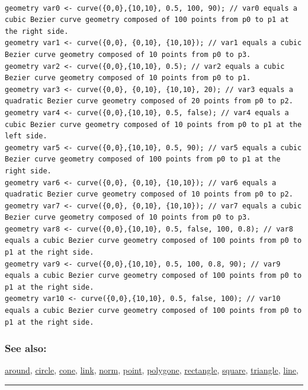 \documentclass[]{book}
\theoremstyle{definition}
\theoremstyle{definition}
\theoremstyle{definition}
\theoremstyle{remark}
\begin{document}
\begin{verbatim}
 
geometry var0 <- curve({0,0},{10,10}, 0.5, 100, 90); // var0 equals a cubic Bezier curve geometry composed of 100 points from p0 to p1 at the right side. 
geometry var1 <- curve({0,0}, {0,10}, {10,10}); // var1 equals a cubic Bezier curve geometry composed of 10 points from p0 to p3. 
geometry var2 <- curve({0,0},{10,10}, 0.5); // var2 equals a cubic Bezier curve geometry composed of 10 points from p0 to p1. 
geometry var3 <- curve({0,0}, {0,10}, {10,10}, 20); // var3 equals a quadratic Bezier curve geometry composed of 20 points from p0 to p2. 
geometry var4 <- curve({0,0},{10,10}, 0.5, false); // var4 equals a cubic Bezier curve geometry composed of 10 points from p0 to p1 at the left side. 
geometry var5 <- curve({0,0},{10,10}, 0.5, 90); // var5 equals a cubic Bezier curve geometry composed of 100 points from p0 to p1 at the right side. 
geometry var6 <- curve({0,0}, {0,10}, {10,10}); // var6 equals a quadratic Bezier curve geometry composed of 10 points from p0 to p2. 
geometry var7 <- curve({0,0}, {0,10}, {10,10}); // var7 equals a cubic Bezier curve geometry composed of 10 points from p0 to p3. 
geometry var8 <- curve({0,0},{10,10}, 0.5, false, 100, 0.8); // var8 equals a cubic Bezier curve geometry composed of 100 points from p0 to p1 at the right side. 
geometry var9 <- curve({0,0},{10,10}, 0.5, 100, 0.8, 90); // var9 equals a cubic Bezier curve geometry composed of 100 points from p0 to p1 at the right side. 
geometry var10 <- curve({0,0},{10,10}, 0.5, false, 100); // var10 equals a cubic Bezier curve geometry composed of 100 points from p0 to p1 at the right side.
\end{verbatim}

\subsubsection{See also:}\label{see-also-74}

\href{operators-a-to-a.html\#around}{around},
\href{operators-b-to-c.html\#circle}{circle},
\href{operators-b-to-c.html\#cone}{cone},
\href{operators-i-to-m.html\#link}{link},
\href{operators-n-to-r.html\#norm}{norm},
\href{operators-n-to-r.html\#point}{point},
\href{operators-s-to-z.html\#polygone}{polygone},
\href{operators-n-to-r.html\#rectangle}{rectangle},
\href{operators-s-to-z.html\#square}{square},
\href{operators-s-to-z.html\#triangle}{triangle},
\href{operators-i-to-m.html\#line}{line},

\begin{center}\rule{0.5\linewidth}{\linethickness}\end{center}
\end{document}
